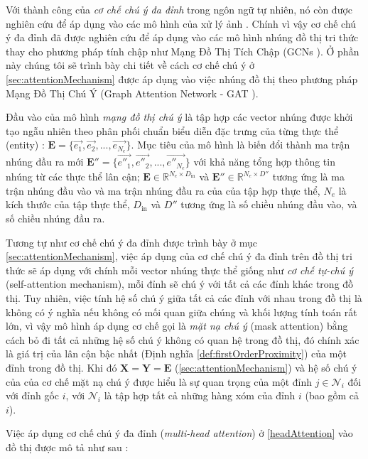 Với thành công của \textit{cơ chế chú ý đa đỉnh} trong ngôn ngữ tự nhiên, nó còn được nghiên cứu để áp dụng vào các mô hình của xử lý ảnh \cite{ramachandran2019stand}. Chính vì vậy cơ chế chú ý đa đỉnh đã được nghiên cứu để áp dụng vào các mô hình nhúng đồ thị tri thức thay cho phương pháp tính chập như Mạng Đồ Thị Tích Chập (GCNs \cite{kipf2016semi}). Ở phần này chúng tôi sẽ trình bày chi tiết về cách cơ chế chú ý ở \ref{sec:attentionMechanism} được áp dụng vào việc nhúng đồ thị theo phương pháp Mạng Đồ Thị Chú Ý (Graph Attention Network - GAT \cite{velivckovic2017graph}).

Đầu vào của mô hình \textit{mạng đồ thị chú ý} là tập hợp các vector nhúng được khởi tạo ngẫu nhiên theo phân phối chuẩn biểu diễn đặc trưng của từng thực thể (entity) : $\mathbf{E} = \Big\{\overrightarrow{e_1}, \overrightarrow{e_2}, ...,  \overrightarrow{e_{N_e}}\Big\}$. Mục tiêu của mô hình là biến đổi thành ma trận nhúng đầu ra mới $\mathbf{E}'' = \Big\{\overrightarrow{e''_1}, \overrightarrow{e''_2}, ...,  \overrightarrow{e''_{N_e}}\Big\}$ với khả năng tổng hợp thông tin nhúng từ các thực thể lân cận; $\mathbf{E} \in \mathbb{R}^{N_e \times D_{\text{in}}}$ và $\mathbf{E}'' \in \mathbb{R}^{N_e \times D''}$ tương ứng là ma trận nhúng đầu vào và ma trận nhúng đầu ra của của tập hợp thực thể, $N_e$ là kích thước của tập thực thể, $D_{\text{in}}$ và $D''$ tương ứng là số chiều nhúng đầu vào, và số chiều nhúng đầu ra.

Tương tự như cơ chế chú ý đa đỉnh được trình bày ở mục \ref{sec:attentionMechanism}, việc áp dụng của cơ chế chú ý đa đỉnh trên đồ thị tri thức sẽ áp dụng với chính mỗi vector nhúng thực thể giống như \textit{cơ chế tự-chú ý} (self-attention mechanism), mỗi đỉnh sẽ chú ý với tất cả các đỉnh khác trong đồ thị. Tuy nhiên, việc tính hệ số chú ý giữa tất cả các đỉnh với nhau trong đồ thị là không có ý nghĩa nếu không có mối quan giữa chúng và khối lượng tính toán rất lớn, vì vậy mô hình áp dụng cơ chế gọi là \textit{mặt nạ chú ý} (mask attention) bằng cách bỏ đi tất cả những hệ số chú ý không có quan hệ trong đồ thị, đó chính xác là giá trị của lân cận bậc nhất (Định nghĩa \ref{def:firstOrderProximity}) của một đỉnh trong đồ thị. Khi đó $\mathbf{X} = \mathbf{Y} = \mathbf{E}$ (\ref{sec:attentionMechanism}) và hệ số chú ý của của cơ chế mặt nạ chú ý được hiểu là sự quan trọng của một đỉnh $j \in \mathcal{N}_{i}$ đối với đỉnh gốc $i$, với $\mathcal{N}_{i}$ là tập hợp tất cả những hàng xóm của đỉnh $i$ (bao gồm cả $i$). 

Việc áp dụng cơ chế chú ý đa đỉnh (\textit{multi-head attention}) ở \ref{headAttention} vào đồ thị được mô tả như sau :

